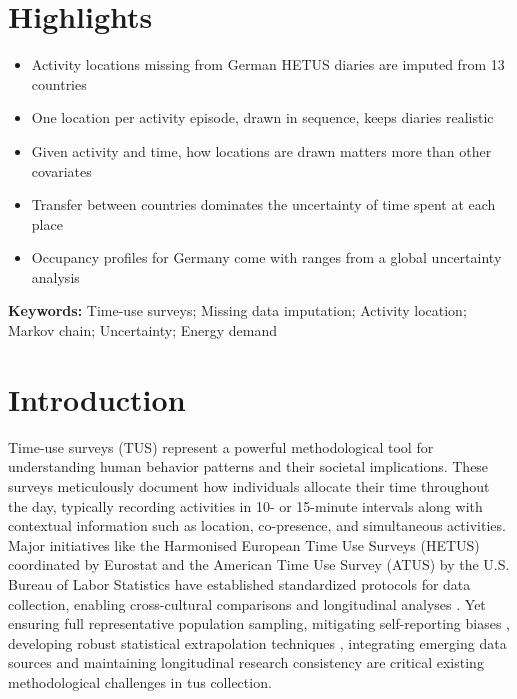 \documentclass[a4paper]{article}
\begin{document}
\section*{Highlights}
\begin{itemize}
    \item Activity locations missing from German HETUS diaries are imputed from 13 countries
    \item One location per activity episode, drawn in sequence, keeps diaries realistic
    \item Given activity and time, how locations are drawn matters more than other covariates
    \item Transfer between countries dominates the uncertainty of time spent at each place
    \item Occupancy profiles for Germany come with ranges from a global uncertainty analysis
\end{itemize}

\textbf{Keywords:} Time-use surveys; Missing data imputation; Activity location; Markov chain; Uncertainty; Energy demand


\section{Introduction}
Time-use surveys (TUS) represent a powerful methodological tool for understanding human behavior patterns and their societal implications. These surveys meticulously document how individuals allocate their time throughout the day, typically recording activities in 10- or 15-minute intervals along with contextual information such as location, co-presence, and simultaneous activities. Major initiatives like the Harmonised European Time Use Surveys (HETUS) coordinated by Eurostat \parencite{eurostatHarmonisedEuropeanTime2020,atus2020overview} and the American Time Use Survey (ATUS) by the U.S. Bureau of Labor Statistics have established standardized protocols for data collection, enabling cross-cultural comparisons and longitudinal analyses \parencite{pentlandTimeUseResearch2007}. Yet ensuring full representative population sampling, mitigating self-reporting biases \parencite{erkipIncreasingEffectivenessTimeuse2011,waltheryImprovingStylisedWorking2019a}, developing robust statistical extrapolation techniques \parencite{kanMeasurementErrorStylized2008,Osman2021}, integrating emerging data sources \parencite{harveyTimeDiariesTime1976,aschauerTimeUseMobility2019} and maintaining longitudinal research consistency \parencite{gerikeTimeUseTravel2015} are critical existing methodological challenges in \ac{tus} collection.
\end{document}
